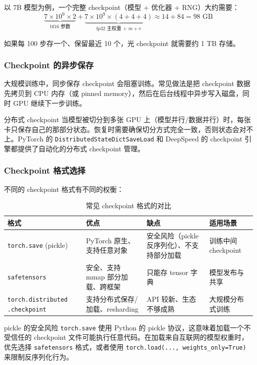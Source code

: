 \documentclass[a4paper]{article}
\begin{document}
以 7B 模型为例，一个完整 checkpoint（模型 + 优化器 + RNG）大约需要：
$$
\underbrace{7 \times 10^9 \times 2}_{\text{bf16 参数}} + \underbrace{7 \times 10^9 \times (4+4+4)}_{\text{fp32 主权重 + } m + v} \approx 14 + 84 = 98 \text{ GB}
$$

如果每 100 步存一个、保留最近 10 个，光 checkpoint 就需要约 1 TB 存储。

\subsubsection{Checkpoint 的异步保存}

大规模训练中，同步保存 checkpoint 会阻塞训练。常见做法是把 checkpoint 数据先拷贝到 CPU 内存（或 pinned memory），然后在后台线程中异步写入磁盘，同时 GPU 继续下一步训练。

\begin{knowledgebox}{分布式 checkpoint}
当模型被切分到多张 GPU 上（模型并行/数据并行）时，每张卡只保存自己的那部分状态。恢复时需要确保切分方式完全一致，否则状态会对不上。PyTorch 的 \texttt{DistributedStateDictSaveLoad} 和 DeepSpeed 的 checkpoint 引擎都提供了自动化的分布式 checkpoint 管理。
\end{knowledgebox}

\subsubsection{Checkpoint 格式选择}

不同的 checkpoint 格式有不同的权衡：

\begin{table}[H]
\centering
\begin{tabular}{p{}p{}p{}p{}}
\toprule
\textbf{格式} & \textbf{优点} & \textbf{缺点} & \textbf{适用场景} \\
\midrule
\texttt{torch.save} (pickle) & PyTorch 原生、支持任意对象 & 安全风险（pickle 反序列化）、不支持部分加载 & 训练中间 checkpoint \\
\texttt{safetensors} & 安全、支持 mmap 部分加载、跨框架 & 只能存 tensor 字典 & 模型发布与共享 \\
\texttt{torch.distributed .checkpoint} & 支持分布式保存/加载、resharding & API 较新、生态不够成熟 & 大规模分布式训练 \\
\bottomrule
\end{tabular}
\caption{常见 checkpoint 格式的对比}
\end{table}

\begin{warningbox}{pickle 的安全风险}
\texttt{torch.save} 使用 Python 的 pickle 协议，这意味着加载一个不受信任的 checkpoint 文件可能执行任意代码。在加载来自互联网的模型权重时，优先选择 \texttt{safetensors} 格式，或者使用 \texttt{torch.load(..., weights\_only=True)} 来限制反序列化行为。
\end{warningbox}
\end{document}
